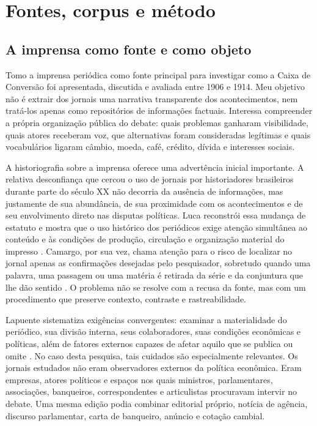 \chapter{Fontes, corpus e método}

\section{A imprensa como fonte e como objeto}

Tomo a imprensa periódica como fonte principal para investigar como a Caixa de Conversão foi apresentada, discutida e avaliada entre 1906 e 1914. Meu objetivo não é extrair dos jornais uma narrativa transparente dos acontecimentos, nem tratá-los apenas como repositórios de informações factuais. Interessa compreender a própria organização pública do debate: quais problemas ganharam visibilidade, quais atores receberam voz, que alternativas foram consideradas legítimas e quais vocabulários ligaram câmbio, moeda, café, crédito, dívida e interesses sociais.

A historiografia sobre a imprensa oferece uma advertência inicial importante. A relativa desconfiança que cercou o uso de jornais por historiadores brasileiros durante parte do século XX não decorria da ausência de informações, mas justamente de sua abundância, de sua proximidade com os acontecimentos e de seu envolvimento direto nas disputas políticas. Luca reconstrói essa mudança de estatuto e mostra que o uso histórico dos periódicos exige atenção simultânea ao conteúdo e às condições de produção, circulação e organização material do impresso \cite{luca2005}. Camargo, por sua vez, chama atenção para o risco de localizar no jornal apenas as confirmações desejadas pelo pesquisador, sobretudo quando uma palavra, uma passagem ou uma matéria é retirada da série e da conjuntura que lhe dão sentido \cite{camargo1969}. O problema não se resolve com a recusa da fonte, mas com um procedimento que preserve contexto, contraste e rastreabilidade.

Lapuente sistematiza exigências convergentes: examinar a materialidade do periódico, sua divisão interna, seus colaboradores, suas condições econômicas e políticas, além de fatores externos capazes de afetar aquilo que se publica ou omite \cite{lapuente2015}. No caso desta pesquisa, tais cuidados são especialmente relevantes. Os jornais estudados não eram observadores externos da política econômica. Eram empresas, atores políticos e espaços nos quais ministros, parlamentares, associações, banqueiros, correspondentes e articulistas procuravam intervir no debate. Uma mesma edição podia combinar editorial próprio, notícia de agência, discurso parlamentar, carta de banqueiro, anúncio e cotação cambial.

